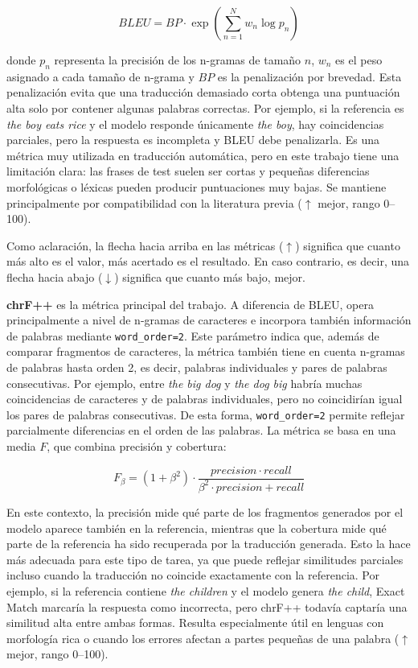 \[
BLEU = BP \cdot \exp\left(\sum_{n=1}^{N} w_n \log p_n\right)
\]

donde \(p_n\) representa la precisión de los n-gramas de tamaño \(n\), \(w_n\) es el peso asignado a cada tamaño de n-grama y \(BP\) es la penalización por brevedad. Esta penalización evita que una traducción demasiado corta obtenga una puntuación alta solo por contener algunas palabras correctas. Por ejemplo, si la referencia es \textit{the boy eats rice} y el modelo responde únicamente \textit{the boy}, hay coincidencias parciales, pero la respuesta es incompleta y BLEU debe penalizarla. Es una métrica muy utilizada en traducción automática, pero en este trabajo tiene una limitación clara: las frases de test suelen ser cortas y pequeñas diferencias morfológicas o léxicas pueden producir puntuaciones muy bajas. Se mantiene principalmente por compatibilidad con la literatura previa (\(\uparrow\) mejor, rango 0--100).

Como aclaración, la flecha hacia arriba en las métricas (\(\uparrow\)) significa que cuanto más alto es el valor, más acertado es el resultado. En caso contrario, es decir, una flecha hacia abajo (\(\downarrow\)) significa que cuanto más bajo, mejor.

\textbf{chrF++} \citep{popovic2017chrf} es la métrica principal del trabajo. A diferencia de BLEU, opera principalmente a nivel de n-gramas de caracteres e incorpora también información de palabras mediante \texttt{word\_order=2}. Este parámetro indica que, además de comparar fragmentos de caracteres, la métrica también tiene en cuenta n-gramas de palabras hasta orden 2, es decir, palabras individuales y pares de palabras consecutivas. Por ejemplo, entre \textit{the big dog} y \textit{the dog big} habría muchas coincidencias de caracteres y de palabras individuales, pero no coincidirían igual los pares de palabras consecutivas. De esta forma, \texttt{word\_order=2} permite reflejar parcialmente diferencias en el orden de las palabras. La métrica se basa en una media \(F\), que combina precisión y cobertura:

\[
F_{\beta} = (1+\beta^2)\cdot \frac{precision \cdot recall}{\beta^2 \cdot precision + recall}
\]

En este contexto, la precisión mide qué parte de los fragmentos generados por el modelo aparece también en la referencia, mientras que la cobertura mide qué parte de la referencia ha sido recuperada por la traducción generada. Esto la hace más adecuada para este tipo de tarea, ya que puede reflejar similitudes parciales incluso cuando la traducción no coincide exactamente con la referencia. Por ejemplo, si la referencia contiene \textit{the children} y el modelo genera \textit{the child}, Exact Match marcaría la respuesta como incorrecta, pero chrF++ todavía captaría una similitud alta entre ambas formas. Resulta especialmente útil en lenguas con morfología rica o cuando los errores afectan a partes pequeñas de una palabra (\(\uparrow\) mejor, rango 0--100).

